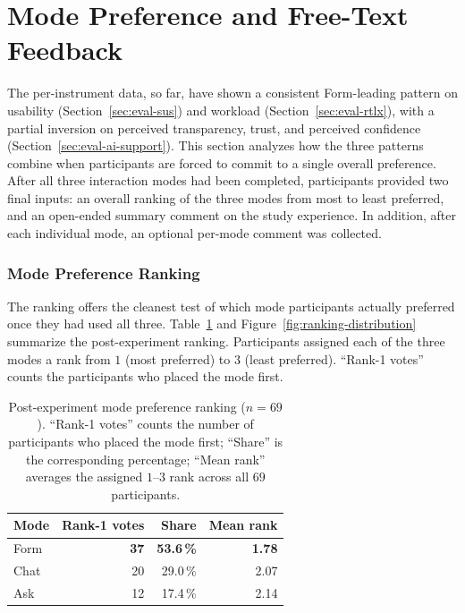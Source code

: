 \section{Mode Preference and Free-Text Feedback}
\label{sec:eval-freeform}

The per-instrument data, so far, have shown a consistent Form-leading
pattern on usability (Section~\ref{sec:eval-sus}) and workload
(Section~\ref{sec:eval-rtlx}), with a partial inversion on perceived
transparency, trust, and perceived confidence
(Section~\ref{sec:eval-ai-support}). This section analyzes how the three
patterns combine when participants are forced to commit to a single
overall preference. After all three interaction modes had been
completed, participants provided two final inputs: an overall
ranking of the three modes from most to least preferred, and an
open-ended summary comment on the study experience. In addition,
after each individual mode, an optional per-mode comment was
collected.

\subsubsection{Mode Preference Ranking}

The ranking offers the cleanest test of which mode participants
actually preferred once they had used all three.
Table~\ref{tab:mode-preference} and Figure~\ref{fig:ranking-distribution} summarize
the post-experiment ranking.
Participants assigned each of the three modes a rank from
$1$ (most preferred) to $3$ (least preferred). ``Rank-1 votes''
counts the participants who placed the mode first.

\begin{table}[htbp]
\centering
\begin{tabular}{@{}l r r r@{}}
\toprule
Mode & Rank-1 votes & Share & Mean rank \\
\midrule
Form & \textbf{37} & \textbf{53.6\,\%} & \textbf{1.78} \\
Chat & 20 & 29.0\,\% & 2.07 \\
Ask  & 12 & 17.4\,\% & 2.14 \\
\bottomrule
\end{tabular}
\caption{Post-experiment mode preference ranking ($n = 69$).
``Rank-1 votes'' counts the number of participants who placed the
mode first; ``Share'' is the corresponding percentage; ``Mean rank''
averages the assigned $1$--$3$ rank across all $69$ participants.}
\label{tab:mode-preference}
\end{table}

